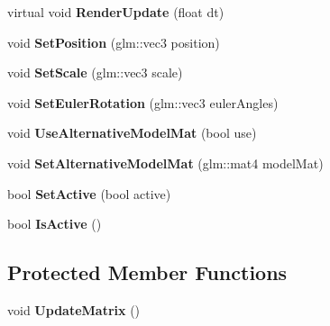 \begin{DoxyCompactItemize}
\item 
\mbox{\label{class_object_a9b9491a79b85055e08ab3c8e7f2a4283}} 
virtual void {\bfseries Render\+Update} (float dt)
\item 
\mbox{\label{class_object_adbffb47c9daf536f5ccd668d060a0490}} 
void {\bfseries Set\+Position} (glm\+::vec3 position)
\item 
\mbox{\label{class_object_a08faf59cf967fae31dd3ed0aea43a372}} 
void {\bfseries Set\+Scale} (glm\+::vec3 scale)
\item 
\mbox{\label{class_object_a0aaf9cce0a37d5bb0af6eb11ab8dce64}} 
void {\bfseries Set\+Euler\+Rotation} (glm\+::vec3 euler\+Angles)
\item 
\mbox{\label{class_object_a5930b30196790ae109835e4f24a85b29}} 
void {\bfseries Use\+Alternative\+Model\+Mat} (bool use)
\item 
\mbox{\label{class_object_a178b374670d4681c61556a352276f96a}} 
void {\bfseries Set\+Alternative\+Model\+Mat} (glm\+::mat4 model\+Mat)
\item 
\mbox{\label{class_object_ab1946453ecbf12a897ba6a363704cd86}} 
bool {\bfseries Set\+Active} (bool active)
\item 
\mbox{\label{class_object_a49327b515f7e613c882f33c2b058ab98}} 
bool {\bfseries Is\+Active} ()
\end{DoxyCompactItemize}
\subsection*{Protected Member Functions}
\begin{DoxyCompactItemize}
\item 
\mbox{\label{class_object_af08c7cf7a01b230d6967551c52bdff63}} 
void {\bfseries Update\+Matrix} ()
\end{DoxyCompactItemize}

